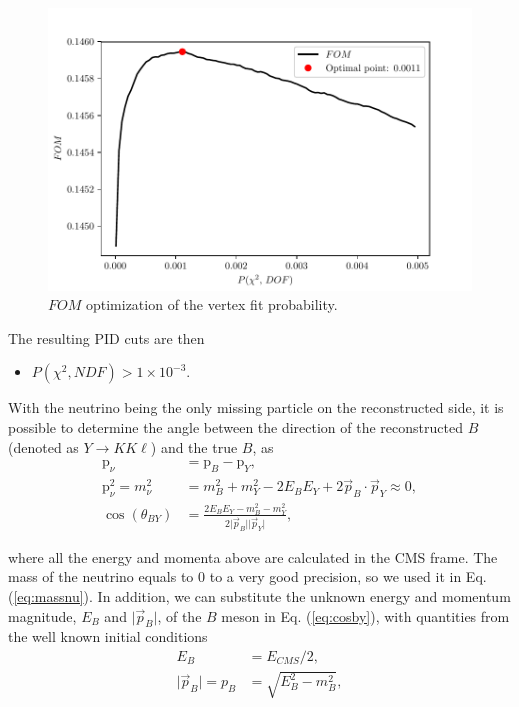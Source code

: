 \documentclass[oneside,a4paper,openany,12pt]{scrbook}
\begin{document}
\begin{figure}[H]
\centering
\captionsetup{width=.7\linewidth}
\includegraphics[scale=0.6]{fig/VTX_opt}
\caption{$FOM$ optimization of the vertex fit probability.}
\label{fig:vtxopt}
\end{figure}

The resulting PID cuts are then
\begin{itemize}
\item $P(\chi^2,NDF) > 1\times 10^{-3}$.
\end{itemize}

With the neutrino being the only missing particle on the reconstructed side, it is possible to determine the angle between the direction of the reconstructed $B$ (denoted as $Y \to K K \ell$) and the true $B$, as
\begin{align}
\mathrm{p}_\nu &= \mathrm{p}_B - \mathrm{p}_{Y}, \\
\label{eq:massnu}
\mathrm{p}_\nu^2 = m_\nu^2 &= m_B^2 + m_Y^2 - 2E_BE_Y + 2\vec{p}_B \cdot \vec{p}_Y \approx 0, \\ 
\label{eq:cosby}
\cos \left(\theta_{BY}\right) &= \frac{2E_BE_Y - m_B^2 - m_Y^2}{2\vert \vec{p}_B \vert \vert \vec{p}_Y\vert},
\end{align} 

where all the energy and momenta above are calculated in the CMS frame. The mass of the neutrino equals to 0 to a very good precision, so we used it in Eq. (\ref{eq:massnu}). In addition, we can substitute the unknown energy and momentum magnitude, $E_B$ and $\vert \vec{p}_B \vert$, of the $B$ meson in Eq. (\ref{eq:cosby}), with quantities from the well known initial conditions
\begin{align}
E_B &= E_{CMS} / 2,\\
\vert \vec{p}_B \vert = p_B &= \sqrt{E_B^2 - m_B^2},
\end{align} 
\end{document}
